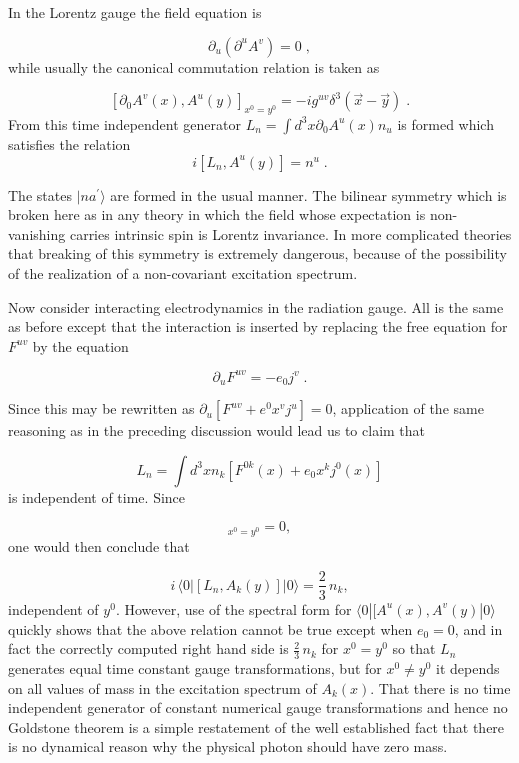 \documentclass[%
  12pt,
  paper=letter,
  abstracton,
  pagesize=auto,
  version=last,
  DIV=calc
  ]{article}
\begin{document}
In the Lorentz gauge the field equation is

\[\partial_u (\partial^u A^v) = 0\; ,\]
while usually the canonical commutation relation is taken as

\begin{equation}
\label{eq:4}
[\partial_0 A^v (x), A^u (y)]_{x^0=y^0}=-i g^{u v} \delta^3 (\vec x - \vec y) \; .
\end{equation}
From this time independent generator $L_n=\int d^3 x \partial_0 A^u
(x) n_u$ is formed which satisfies the relation
\[i [L_n, A^u (y)] = n^u \; .\]

The states $|na^{\prime}\rangle$ are formed in the usual manner.  The
bilinear symmetry which is broken here as in any theory in which the
field whose expectation is non-vanishing carries intrinsic spin is
Lorentz invariance.  In more complicated theories that breaking of
this symmetry is extremely dangerous, because of the possibility of
the realization of a non-covariant excitation spectrum.

Now consider interacting electrodynamics in the radiation gauge.  All
is the same as before except that the interaction is inserted by
replacing the free equation for $F^{uv}$ by the equation

\[\partial_u F^{uv}=-e_0 j^v\; .\]

Since this may be rewritten as $\partial_u[F^{uv} + e^0 x^v j^u]=0$,
application of the same reasoning as in the preceding discussion would
lead us to claim that

\begin{equation*}
L_n=\int d^3 x n_k [ F^{0k} (x) + e_0 x^k j^0 (x)]
\end{equation*}
is independent of time.  Since

\begin{equation*}
[j^0 (x), A^k (y)]_{x^0=y^0} = 0,
\end{equation*}
one would then conclude that

\begin{equation*}
i\, \langle 0 | [ L_n, A_k (y) ] |0\rangle = \frac {2}{3}\, n_k,
\end{equation*}
independent of $y^0$.  However, use of the spectral form for
$\langle 0|[A^u(x), A^v (y)|0\rangle$ quickly shows that the above relation cannot
be true except when $e_0=0$, and in fact the correctly computed right
hand side is $\frac{2}{3}\, n_k$ for $x^0=y^0$ so that $L_n$ generates
equal time constant gauge transformations, but for $x^0\neq y^0$ it
depends on all values of mass in the excitation spectrum of $A_k (x)$.
That there is no time independent generator of constant numerical
gauge transformations and hence no Goldstone theorem is a simple
restatement of the well established fact that there is no dynamical
reason why the physical photon should have zero mass\cite {12}.
\end{document}
